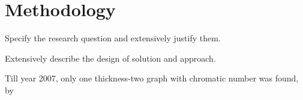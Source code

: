 \chapter{Methodology}

Specify the research question and extensively justify them.

Extensively describe the design of solution and approach.

Till year 2007, only one thickness-two graph with chromatic number was found, by 